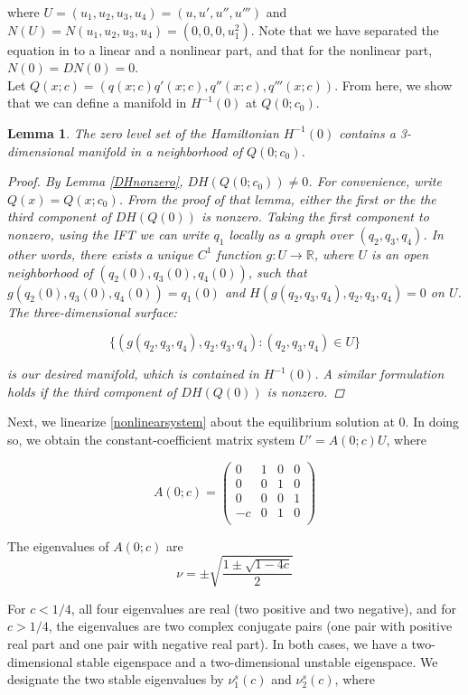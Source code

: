 \documentclass[12pt]{article}
\def\R{{\mathbb R}}
\newtheorem{lemma}{Lemma}
\begin{document}
where $U = (u_1, u_2, u_3, u_4) = (u, u', u'', u''')$ and $N(U) = N(u_1, u_2, u_3, u_4) = (0, 0, 0, u_1^2)$. Note that we have separated the equation in to a linear and a nonlinear part, and that for the nonlinear part, $N(0) = DN(0) = 0$. \\

Let $Q(x; c) = (q(x; c) q'(x; c), q''(x; c), q'''(x; c))$. From here, we show that we can define a manifold in $H^{-1}(0)$ at $Q(0; c_0)$.

\begin{lemma}\label{manifoldinH0}
The zero level set of the Hamiltonian $H^{-1}(0)$ contains a 3-dimensional manifold in a neighborhood of $Q(0; c_0)$.
\begin{proof}
By Lemma \ref{DHnonzero}, $DH(Q(0; c_0)) \neq 0$. For convenience, write $Q(x) = Q(x; c_0)$. From the proof of that lemma, either the first or the the third component of $DH(Q(0))$ is nonzero. Taking the first component to nonzero, using the IFT we can write $q_1$ locally as a graph over $(q_2, q_3, q_4)$. In other words, there exists a unique $C^1$ function $g: U \rightarrow \R$, where $U$ is an open neighborhood of $(q_2(0), q_3(0), q_4(0))$, such that $g(q_2(0), q_3(0), q_4(0)) = q_1(0)$ and $H(g(q_2, q_3, q_4), q_2, q_3, q_4 ) = 0$ on $U$. The three-dimensional surface:

\[
\{ (g(q_2, q_3, q_4), q_2, q_3, q_4) : (q_2, q_3, q_4) \in U \}
\]

is our desired manifold, which is contained in $H^{-1}(0)$. A similar formulation holds if the third component of $DH(Q(0))$ is nonzero.
\end{proof}
\end{lemma}

Next, we linearize \eqref{nonlinearsystem} about the equilibrium solution at 0. In doing so, we obtain the constant-coefficient matrix system $U' = A(0; c) U$, where

\[
A(0; c) = 
\begin{pmatrix}
0 & 1 & 0 & 0 \\
0 & 0 & 1 & 0 \\
0 & 0 & 0 & 1 \\
-c & 0 & 1 & 0 \\ 
\end{pmatrix}
\]

The eigenvalues of $A(0; c)$ are
\[
\nu = \pm \sqrt{ \frac{1 \pm \sqrt{1 - 4c} }{2}}
\]

For $c < 1/4$, all four eigenvalues are real (two positive and two negative), and for $c > 1/4$, the eigenvalues are two complex conjugate pairs (one pair with positive real part and one pair with negative real part). In both cases, we have a two-dimensional stable eigenspace and a two-dimensional unstable eigenspace. We designate the two stable eigenvalues by $\nu_1^s(c)$ and $\nu_2^s(c)$, where
\end{document}
